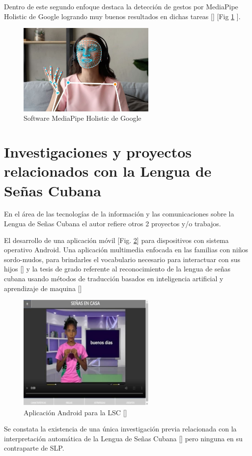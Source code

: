 Dentro de este segundo enfoque destaca la detección de gestos por MediaPipe Holistic de Google logrando muy buenos resultados en dichas tareas [\cite{mediapipe_2020}] [Fig \ref{fig:mediapipe} ].


\begin{figure}[ht!]
    \centering
    \includegraphics[width=0.6\textwidth]{Graphics/mediapipe.png}
    \caption{Software MediaPipe Holistic de Google}
    \label{fig:mediapipe}
\end{figure}


\section{Investigaciones y proyectos relacionados con la Lengua de Señas Cubana}\label{section:state-of-the-art:cubana}
En el área de las tecnologías de la información y las
comunicaciones sobre la Lengua de Señas Cubana  el autor refiere otros 2 proyectos y/o trabajos.
 
 El desarrollo de una aplicación móvil [Fig. \ref{fig:app_cubana}] para dispositivos con sistema operativo Android. Una aplicación multimedia enfocada en las familias con niños sordo-mudos, para brindarles el vocabulario necesario para interactuar con sus hijos [\cite{android_app_lsc}] y la tesis de grado referente al reconocimiento de la lengua de señas cubana usando métodos de traducción basados en inteligencia artificial y aprendizaje de maquina [\cite{leynier-lsc-2021}]

\begin{figure}[ht!]
    \centering
    \includegraphics[width=0.6\textwidth]{Graphics/app_cubana.png}
    \caption{ Aplicación Android para la LSC [\cite{android_app_lsc}]}
    \label{fig:app_cubana}
\end{figure}

Se constata la existencia de una única investigación previa relacionada con la interpretación automática de la Lengua de Señas Cubana [\cite{leynier-lsc-2021}] pero ninguna en su contraparte de SLP.